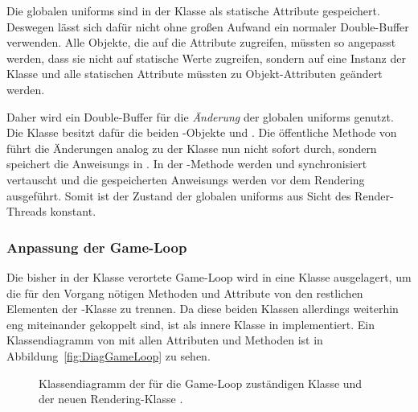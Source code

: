 Die globalen \glspl{uniform} sind in der Klasse \classGlobalUniforms{} als statische Attribute gespeichert. Deswegen lässt sich dafür nicht ohne großen Aufwand ein normaler Double-Buffer verwenden. Alle Objekte, die auf die Attribute zugreifen, müssten so angepasst werden, dass sie nicht auf statische Werte zugreifen, sondern auf eine Instanz der Klasse und alle statischen Attribute müssten zu Objekt-Attributen geändert werden.

Daher wird ein Double-Buffer für die \emph{Änderung} der globalen \glspl{uniform} genutzt. Die Klasse \classMasterRenderer{} besitzt dafür die beiden \classRunnable{}-Objekte  und . Die öffentliche Methode  von \classMasterRenderer{} führt die Änderungen analog zu der Klasse \classLoader{} nun nicht sofort durch, sondern speichert die \glspl{Anweisung} in . In der -Methode werden  und  synchronisiert vertauscht und die gespeicherten \glspl{Anweisung} werden vor dem Rendering ausgeführt. Somit ist der Zustand der globalen \glspl{uniform} aus Sicht des Render-Threads konstant.

\subsubsection{Anpassung der Game-Loop}\label{sec:adjustGameLoop}
Die bisher in der Klasse \classGame{} verortete Game-Loop wird in eine Klasse \classGameLoop{} ausgelagert, um die für den Vorgang nötigen Methoden und Attribute von den restlichen Elementen der \classGame{}-Klasse zu trennen. Da diese beiden Klassen allerdings weiterhin eng miteinander gekoppelt sind, ist \classGameLoop{} als innere Klasse in \classGame{} implementiert. Ein Klassendiagramm von  \classGameLoop{} mit allen Attributen und Methoden ist in Abbildung~\vref{fig:DiagGameLoop} zu sehen.

\begin{figure}[htbp]
	\centering
	
	\caption[Klassendiagramm von \classGameLoop{} und \classRenderThread{}.]{Klassendiagramm der für die Game-Loop zuständigen Klasse \classGameLoop{} und der neuen Rendering-Klasse \classRenderThread{}.}\label{fig:DiagGameLoop}
\end{figure}

